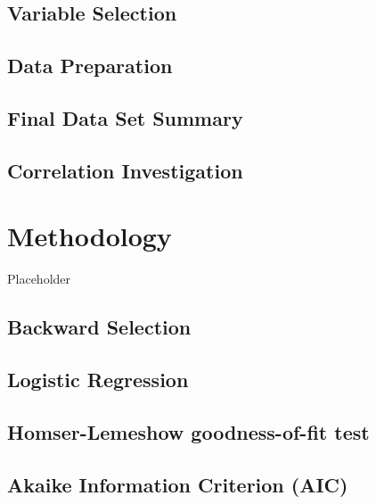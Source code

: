\documentclass[12pt, oneside]{book}
\begin{document}
\hypertarget{variable-selection}{%
\section{Variable Selection}\label{variable-selection}}

\hypertarget{data-preparation}{%
\section{Data Preparation}\label{data-preparation}}

\hypertarget{final-data-set-summary}{%
\section{Final Data Set Summary}\label{final-data-set-summary}}

\hypertarget{correlation-investigation}{%
\section{Correlation Investigation}\label{correlation-investigation}}

\hypertarget{method}{%
\chapter{Methodology}\label{method}}

Placeholder

\hypertarget{backward-selection}{%
\section{Backward Selection}\label{backward-selection}}

\hypertarget{logistic-regression}{%
\section{Logistic Regression}\label{logistic-regression}}

\hypertarget{homser-lemeshow-goodness-of-fit-test}{%
\section{Homser-Lemeshow goodness-of-fit
test}\label{homser-lemeshow-goodness-of-fit-test}}

\hypertarget{akaike-information-criterion-aic}{%
\section{Akaike Information Criterion
(AIC)}\label{akaike-information-criterion-aic}}
\end{document}
